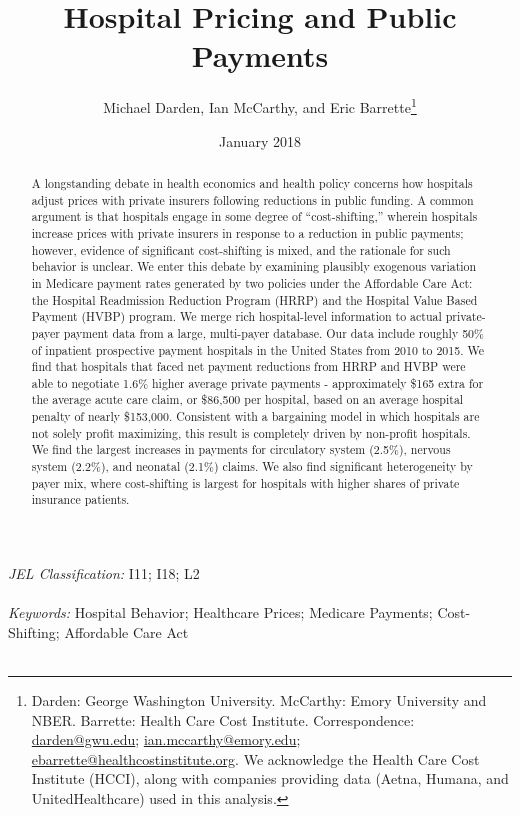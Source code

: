 \documentclass[12pt]{article}
\begin{document}
\title{Hospital Pricing and Public Payments}
\author{%
  Michael Darden, Ian McCarthy, and Eric Barrette\thanks{Darden: George Washington University. McCarthy: Emory University and NBER. Barrette: Health Care Cost Institute.  Correspondence: \href{mailto:darden@gwu.edu}{darden@gwu.edu}; \href{mailto:ian.mccarthy@emory.edu}{ian.mccarthy@emory.edu}; \href{mailto:ebarrette@healthcostinstitute.org}{ebarrette@healthcostinstitute.org}. We acknowledge the Health Care Cost Institute (HCCI), along with companies providing data (Aetna, Humana, and UnitedHealthcare) used in this analysis.}
}
\date{January 2018}

\maketitle

\begin{abstract}
A longstanding debate in health economics and health policy concerns how hospitals adjust prices with private insurers following reductions in public funding. A common argument is that hospitals engage in some degree of ``cost-shifting,'' wherein hospitals increase prices with private insurers in response to a reduction in public payments; however, evidence of significant cost-shifting is mixed, and the rationale for such behavior is unclear.  We enter this debate by examining plausibly exogenous variation in Medicare payment rates generated by two policies under the Affordable Care Act: the Hospital Readmission Reduction Program (HRRP) and the Hospital Value Based Payment (HVBP) program.  We merge rich hospital-level information to actual private-payer payment data from a large, multi-payer database. Our data include roughly 50\% of inpatient prospective payment hospitals in the United States from 2010 to 2015. We find that hospitals that faced net payment reductions from HRRP and HVBP were able to negotiate 1.6\% higher average private payments - approximately \$165 extra for the average acute care claim, or \$86,500 per hospital, based on an average hospital penalty of nearly \$153,000.  Consistent with a bargaining model in which hospitals are not solely profit maximizing, this result is completely driven by non-profit hospitals.  We find the largest increases in payments for circulatory system (2.5\%), nervous system (2.2\%), and neonatal (2.1\%) claims.  We also find significant heterogeneity by payer mix, where cost-shifting is largest for hospitals with higher shares of private insurance patients.
\end{abstract}
\noindent \textit{JEL Classification:} I11; I18; L2 \\\\
\noindent \textit{Keywords:} Hospital Behavior; Healthcare Prices; Medicare Payments; Cost-Shifting; Affordable Care Act\\\\
\end{document}
